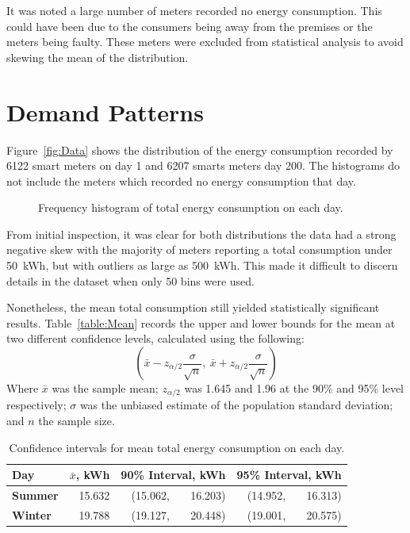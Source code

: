 \documentclass[a4paper,10pt,twocolumn]{article}
\begin{document}
It was noted a large number of meters recorded no energy consumption. This 
could have been due to the consumers being away from the premises or the meters 
being faulty. These meters were excluded from statistical analysis to avoid 
skewing the mean of the distribution.

\section{Demand Patterns}

Figure~\vref{fig:Data} shows the distribution of the energy consumption 
recorded by 6122 smart meters on day 1 and 6207 smarts meters day 200. The 
histograms do not include the meters which recorded no energy consumption that 
day.
    
\begin{figure}[h]
    \centering
    \def\svgwidth{0.5\textwidth}
    
    \caption{Frequency histogram of total energy consumption on each day.}
    \label{fig:Data}
\end{figure}

From initial inspection, it was clear for both distributions the data had a 
strong negative skew with the majority of meters reporting a total consumption 
under 50~kWh, but with outliers as large as 500~kWh. This made it difficult to 
discern details in the dataset when only 50 bins were used.

Nonetheless, the mean total consumption still yielded statistically significant 
results. Table~\vref{table:Mean} records the upper and lower bounds for the 
mean at two different confidence levels, calculated using the following:
\begin{equation}
    \left(\bar{x} - z_{\alpha/2}\frac{\sigma}{\sqrt{n}},~
        \bar{x} + z_{\alpha/2}\frac{\sigma}{\sqrt{n}}\right)
    \label{eq:CI}
\end{equation}
Where $\bar{x}$ was the sample mean; $z_{\alpha/2}$ was 1.645 and 1.96 at the 
90\% and 95\% level respectively; $\sigma$ was the unbiased estimate of the 
population standard deviation; and $n$ the sample size.

\begin{table}[h]
    \centering
    \caption{Confidence intervals for mean total energy consumption on each 
        day.\vspace{-\parsep}}
    \label{table:Mean}
    \begin{tabular}{lrr@{\,}rr@{\,}r}
        \toprule
        \textbf{Day} & 
        \multicolumn{1}{l}{$\bar{x}$, \tiny{kWh}} & 
        \multicolumn{2}{l}{90\% Interval, \tiny{kWh}} &
        \multicolumn{2}{l}{95\% Interval, \tiny{kWh}} \\
        \midrule
        \textbf{Summer} & 15.632 & (15.062, & 16.203) & (14.952, & 16.313) \\
        \textbf{Winter} & 19.788 & (19.127, & 20.448) & (19.001, & 20.575) \\
        \bottomrule
    \end{tabular}
\end{table}
\end{document}
